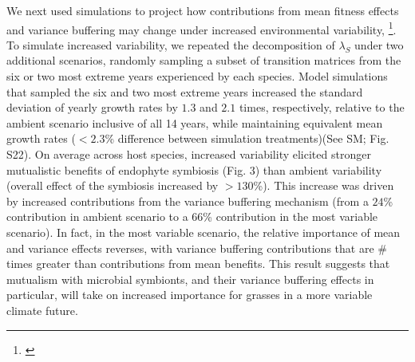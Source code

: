 \documentclass[12pt]{article}
\newcommand{\tom}[2]{{\color{red}{#1}}\footnote{\textit{\color{red}{#2}}}}
\begin{document}
We next used simulations to project how contributions from mean fitness effects and variance buffering may change under increased environmental variability, \tom{a key prediction of climate change forecasts}{cite?}.
To simulate increased variability, we repeated the decomposition of $\lambda_{S}$ under two additional scenarios, randomly sampling a subset of transition matrices from the six or two most extreme years experienced by each species. 
Model simulations that sampled the six and two most extreme years increased the standard deviation of yearly growth rates by $1.3$ and $2.1$ times, respectively, relative to the ambient scenario inclusive of all 14 years, while maintaining equivalent mean growth rates ($<2.3$\% difference between simulation treatments)(See SM; Fig. S22).
On average across host species, increased variability elicited stronger mutualistic benefits of endophyte symbiosis (Fig. 3) than ambient variability (overall effect of the symbiosis increased by $>130 $\%).
This increase was driven by increased contributions from the variance buffering mechanism (from a $24$\% contribution in ambient scenario to a $66$\% contribution in the most variable scenario). 
In fact, in the most variable scenario, the relative importance of mean and variance effects reverses, with variance buffering contributions that are \# times greater than contributions from mean benefits. 
This result suggests that mutualism with microbial symbionts, and their variance buffering effects in particular, will take on increased importance for grasses in a more variable climate future.
\end{document}
